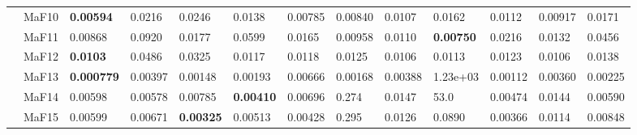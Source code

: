 \documentclass[]{article}
\begin{document}
\begin{landscape}
\begin{table}
\begin{footnotesize}
\begin{tabular}{|l|l|l|l|l|l|l|l|l|l|l|l|l|}
 & MaF10 & \cellcolor{gray95} {\bf 0.00594} & 0.0216 & 0.0246 & 0.0138 & \cellcolor{gray95} 0.00785 & \cellcolor{gray95} 0.00840 & 0.0107 & 0.0162 & 0.0112 & \cellcolor{gray95} 0.00917 & 0.0171\\
 & MaF11 & \cellcolor{gray95} 0.00868 & 0.0920 & 0.0177 & 0.0599 & 0.0165 & \cellcolor{gray95} 0.00958 & \cellcolor{gray95} 0.0110 & \cellcolor{gray95} {\bf 0.00750} & 0.0216 & 0.0132 & 0.0456\\
 & MaF12 & \cellcolor{gray95} {\bf 0.0103} & 0.0486 & 0.0325 & 0.0117 & 0.0118 & 0.0125 & \cellcolor{gray95} 0.0106 & \cellcolor{gray95} 0.0113 & 0.0123 & \cellcolor{gray95} 0.0106 & 0.0138\\
 & MaF13 & \cellcolor{gray95} {\bf 0.000779} & 0.00397 & 0.00148 & 0.00193 & 0.00666 & 0.00168 & 0.00388 & \cellcolor{gray95} 1.23e+03 & \cellcolor{gray95} 0.00112 & 0.00360 & 0.00225\\
 & MaF14 & 0.00598 & \cellcolor{gray95} 0.00578 & 0.00785 & \cellcolor{gray95} {\bf 0.00410} & 0.00696 & 0.274 & 0.0147 & 53.0 & \cellcolor{gray95} 0.00474 & 0.0144 & \cellcolor{gray95} 0.00590\\
 & MaF15 & 0.00599 & 0.00671 & \cellcolor{gray95} {\bf 0.00325} & \cellcolor{gray95} 0.00513 & \cellcolor{gray95} 0.00428 & 0.295 & 0.0126 & 0.0890 & \cellcolor{gray95} 0.00366 & 0.0114 & 0.00848\\
\hline


\end{tabular}
\end{footnotesize}
\end{table}
\end{landscape}
\end{document}
